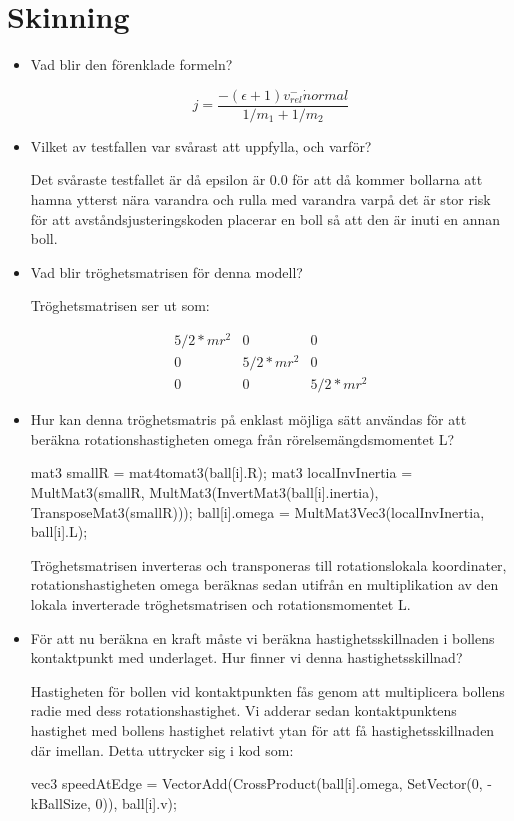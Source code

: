\documentclass[a4paper,12pt]{article}
\begin{document}
\section{Skinning}

\begin{itemize}
\item  Vad blir den förenklade formeln?

  \begin{equation}
    j = \frac{-(\epsilon + 1)v^{-}_{rel} \dot normal}{1/m_1+1/m_2}
  \end{equation}

\item Vilket av testfallen var svårast att uppfylla, och varför?

  Det svåraste testfallet är då epsilon är 0.0 för att då kommer bollarna att hamna ytterst nära varandra och rulla med varandra varpå det är stor risk för att avståndsjusteringskoden placerar en boll så att den är inuti en annan boll.

\item Vad blir tröghetsmatrisen för denna modell?

  Tröghetsmatrisen ser ut som:

  \begin{equation}
    \begin{matrix}
      5/2 * mr^2 & 0 & 0 \\
      0 & 5/2 * mr^2 & 0 \\
      0 & 0 & 5/2 * mr^2
    \end{matrix}
  \end{equation}

\item Hur kan denna tröghetsmatris på enklast möjliga sätt användas för att beräkna rotationshastigheten omega från rörelsemängdsmomentet L?

		mat3 smallR = mat4tomat3(ball[i].R);
		mat3 localInvInertia = MultMat3(smallR, MultMat3(InvertMat3(ball[i].inertia), TransposeMat3(smallR)));
		ball[i].omega = MultMat3Vec3(localInvInertia, ball[i].L);

  Tröghetsmatrisen inverteras och transponeras till rotationslokala koordinater, rotationshastigheten omega beräknas sedan utifrån en multiplikation av den lokala inverterade tröghetsmatrisen och rotationsmomentet L.

\item För att nu beräkna en kraft måste vi beräkna hastighetsskillnaden i bollens kontaktpunkt med underlaget. Hur finner vi denna hastighetsskillnad?

  Hastigheten för bollen vid kontaktpunkten fås genom att multiplicera bollens radie med dess rotationshastighet. Vi adderar sedan kontaktpunktens hastighet med bollens hastighet relativt ytan för att få hastighetsskillnaden där imellan. Detta uttrycker sig i kod som:

		vec3 speedAtEdge = VectorAdd(CrossProduct(ball[i].omega, SetVector(0, -kBallSize, 0)), ball[i].v);

\end{itemize}
\end{document}
